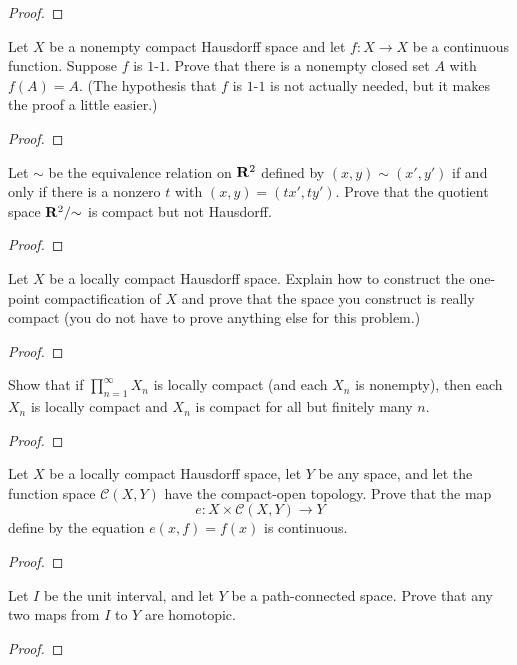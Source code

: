 \begin{proof}
\end{proof}
\begin{problem}
Let $X$ be a nonempty compact Hausdorff space and let $f\colon
X\to X$ be a continuous function. Suppose $f$ is $1$-$1$. Prove
that there is a nonempty closed set $A$ with $f(A)=A$. (The
hypothesis that $f$ is $1$-$1$ is not actually needed, but it
makes the proof a little easier.)
\end{problem}
\begin{proof}
\end{proof}
\begin{problem}
Let $\sim$ be the equivalence relation on $\mathbf{R}^2$ defined by
$(x,y)\sim(x',y')$ if and only if there is a nonzero $t$ with
$(x,y)=(tx',ty')$. Prove that the quotient space $\mathbf{R}^2/{\sim}$
is compact but not Hausdorff.
\end{problem}
\begin{proof}
\end{proof}
\begin{problem}
Let $X$ be a locally compact Hausdorff space. Explain how to
construct the one-point compactification of $X$ and prove that
the space you construct is really compact (you do not have to
prove anything else for this problem.)
\end{problem}
\begin{proof}
\end{proof}
\begin{problem}
Show that if $\prod_{n=1}^\infty X_n$ is locally compact (and
each $X_n$ is nonempty), then each $X_n$ is locally compact and
$X_n$ is compact for all but finitely many $n$.
\end{problem}
\begin{proof}
\end{proof}
\begin{problem}
Let $X$ be a locally compact Hausdorff space, let $Y$ be any
space, and let the function space $\mathcal{C}(X,Y)$ have the
compact-open topology. Prove that the map
\[
e\colon X\times\mathcal{C}(X,Y)\to Y
\]
define by the equation $e(x,f)=f(x)$ is continuous.
\end{problem}
\begin{proof}
\end{proof}
\begin{problem}
Let $I$ be the unit interval, and let $Y$ be a path-connected
space. Prove that any two maps from $I$ to $Y$ are homotopic.
\end{problem}
\begin{proof}
\end{proof}
